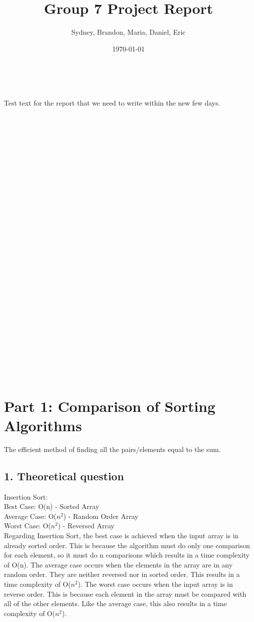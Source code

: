 \documentclass[12pt]{article}
\begin{document}
\title{Group 7 Project Report}
\maketitle
\author{Sydney, Brandon, Maria, Daniel, Eric}\\
\date{\today}
Test text for the report that we need to write within the new few days.
\tableofcontents{}
\listoffigures
\indent \\\\\\\\\\\\\\\\\\\\\\\\\\\\\\\\\\\\\\\\\\\\\\\\\\\\\\
	\section{Part 1: Comparison of Sorting Algorithms}
	The efficient method of finding all the pairs/elements equal to the sum.
	\subsection{1. Theoretical question}
	Insertion Sort:\\
	
	Best Case: O(n) - Sorted Array\\
	\indent Average Case: O($n^2$) - Random Order Array\\
	\indent Worst Case: O($n^2$) - Reversed Array\\
	
	Regarding Insertion Sort, the best case is achieved when the input array is in already sorted order. This is because the algorithm must do only one comparison for each element, so it must 		do n comparisons which results in a time complexity of O(n). The average case occurs when the elements in the array are in any random order. They are neither reversed nor in sorted 			order. This results in a time complexity of O($n^2$). The worst case occurs when the input array is in reverse order. This is because each element in the array must be compared with all of 			the other elements. Like the average case, this also results in a time complexity of O($n^2$).\\ 
	
\end{document}
